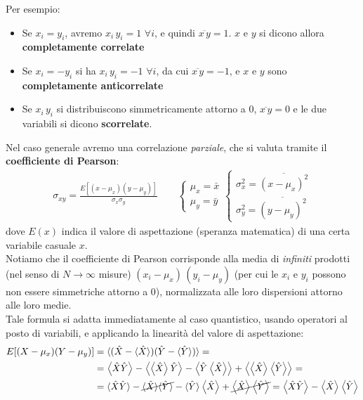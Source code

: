 \documentclass[../../InformazioneQuantistica.tex]{subfiles}
\begin{document}
Per esempio:
\begin{itemize}
\item Se $x_i=y_i$, avremo $x_i\,y_i=1$ $\forall i$, e quindi $\overline{x\,y}=1$. $x$ e $y$ si dicono allora \textbf{completamente correlate}
\item Se $x_i=-y_i$ si ha $x_i\, y_i=-1$ $\forall i$, da cui $\overline{x\,y}=-1$, e $x$ e $y$ sono \textbf{completamente anticorrelate}
\item Se $x_i\, y_i$ si distribuiscono simmetricamente attorno a $0$, $\overline{x\, y}=0$ e le due variabili si dicono \textbf{scorrelate}.
\end{itemize}
Nel caso generale avremo una correlazione \textit{parziale}, che si valuta tramite il \textbf{coefficiente di Pearson}:
\begin{align*}
\sigma_{xy} = \frac{E[(x-\mu_x)(y-\mu_y)]}{\sigma_x \sigma_y} \qquad \begin{cases}
\mu_x = \bar{x}\\
\mu_y = \bar{y}
\end{cases}
\begin{cases}
\sigma_x^2 = \overline{(x-\mu_x)^2}\\
\sigma_y^2 = \overline{(y-\mu_y)^2}
\end{cases}
\end{align*}
dove $E(x)$ indica il valore di aspettazione (speranza matematica) di una certa variabile casuale $x$.\\
Notiamo che il coefficiente di Pearson corrisponde alla media di \textit{infiniti} prodotti (nel senso di $N\to \infty$ misure) $(x_i-\mu_x)\,(y_i-\mu_y)$ (per cui le $x_i$ e $y_i$ possono non essere simmetriche attorno a $0$), normalizzata alle loro dispersioni attorno alle loro medie.\\

Tale formula si adatta immediatamente al caso quantistico, usando operatori al posto di variabili, e applicando la linearità del valore di aspettazione:
\begin{align*}
E[(X-\mu_x)(Y-\mu_y)] &= \langle (\hat{X}-\langle \hat{X}\rangle)(\hat{Y}-\langle \hat{Y}\rangle)\rangle = \\
&= \left\langle{\hat{X}\hat{Y}}\right\rangle - \left\langle{\left\langle{\hat{X}}\right\rangle\hat{Y}}\right\rangle - \left\langle{\hat{Y}\left\langle{ \hat{X}}\right\rangle}\right\rangle+ \left\langle{\left\langle{\hat{X}}\right\rangle\left\langle{\hat{Y}}\right\rangle}\right\rangle = \\
&= \langle \hat{X}\hat{Y}\rangle -\cancel{ \langle \hat{X}\rangle \langle \hat{Y}\rangle} - \langle \hat{Y}\rangle \left\langle{\hat{X}}\right\rangle +\cancel{ \left\langle{\hat{X}}\right\rangle\left\langle{\hat{Y}}\right\rangle} =\left\langle{\hat{X}\hat{Y}}\right\rangle-\left\langle{\hat{X}}\right\rangle\left\langle{\hat{Y}}\right\rangle
\end{align*}
\end{document}
